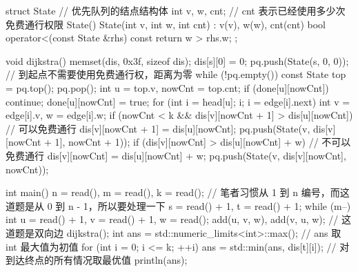 \begin{cppcode}
struct State {    // 优先队列的结点结构体
  int v, w, cnt;  // cnt 表示已经使用多少次免费通行权限
  State() {}
  State(int v, int w, int cnt) : v(v), w(w), cnt(cnt) {}
  bool operator<(const State &rhs) const { return w > rhs.w; }
};

void dijkstra() {
  memset(dis, 0x3f, sizeof dis);
  dis[s][0] = 0;
  pq.push(State(s, 0, 0));  // 到起点不需要使用免费通行权，距离为零
  while (!pq.empty()) {
    const State top = pq.top();
    pq.pop();
    int u = top.v, nowCnt = top.cnt;
    if (done[u][nowCnt]) continue;
    done[u][nowCnt] = true;
    for (int i = head[u]; i; i = edge[i].next) {
      int v = edge[i].v, w = edge[i].w;
      if (nowCnt < k && dis[v][nowCnt + 1] > dis[u][nowCnt]) {  // 可以免费通行
        dis[v][nowCnt + 1] = dis[u][nowCnt];
        pq.push(State(v, dis[v][nowCnt + 1], nowCnt + 1));
      }
      if (dis[v][nowCnt] > dis[u][nowCnt] + w) {  // 不可以免费通行
        dis[v][nowCnt] = dis[u][nowCnt] + w;
        pq.push(State(v, dis[v][nowCnt], nowCnt));
      }
    }
  }
}

int main() {
  n = read(), m = read(), k = read();
  // 笔者习惯从 1 到 n 编号，而这道题是从 0 到 n - 1，所以要处理一下
  s = read() + 1, t = read() + 1;
  while (m--) {
    int u = read() + 1, v = read() + 1, w = read();
    add(u, v, w), add(v, u, w);  // 这道题是双向边
  }
  dijkstra();
  int ans = std::numeric_limits<int>::max();  // ans 取 int 最大值为初值
  for (int i = 0; i <= k; ++i)
    ans = std::min(ans, dis[t][i]);  // 对到达终点的所有情况取最优值
  println(ans);
}
\end{cppcode}
